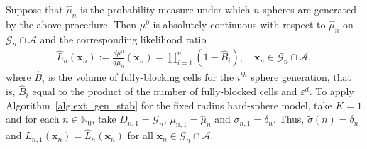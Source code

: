 \documentclass[11pt]{article}
\newcommand{\mbb}{\mathbb}
\newcommand{\lt}{\left}
\newcommand{\rt}{\right}
\newcommand{\wt}{\widetilde}
\newcommand{\wh}{\widehat}
\newcommand{\lfs}{\mathbf{x}}
\begin{document}
Suppose that $\wh \mu_n$ is the probability measure under which $n$ spheres are generated by the above procedure. 
Then $\mu^0$ is absolutely continuous with respect to $\wh \mu_n $ on $ {\mathscr{G}}_n \cap \mathscr{A}$ and the corresponding likelihood ratio 
\begin{align*}
\wh L_n(\lfs_n)  := \frac{d\mu^0}{d\widehat \mu_n}(\lfs_n) = \prod_{i=1}^n\lt(1 -  \wh B_i\rt), \quad \lfs_n \in  {\mathscr{G}}_n \cap \mathscr{A},
\end{align*}
where $\wh B_i$ is the volume of fully-blocking cells for the $i^{th}$ sphere generation, that is, $\wh B_i$ equal to the product of the number of fully-blocked cells and $\varepsilon^d$. 
 To apply Algorithm~\ref{alg:ext_gen_stab} for the fixed radius hard-sphere model, take $K = 1$ and for each ${n \in \mbb{N}_0}$, take ${D_{n,1} =   {\mathscr{G}}_n}$, ${\mu_{n,1} = \wh \mu_n}$ and ${\sigma_{n,1} =\delta_n}$. Thus, ${\wt \sigma(n) = \delta_{n}}$ and ${L_{n,1}(\lfs_n) = \wh L_n(\lfs_n)}$ for all ${\lfs_n \in  {\mathscr{G}}_n \cap \mathscr{A}}$. \\
\end{document}
